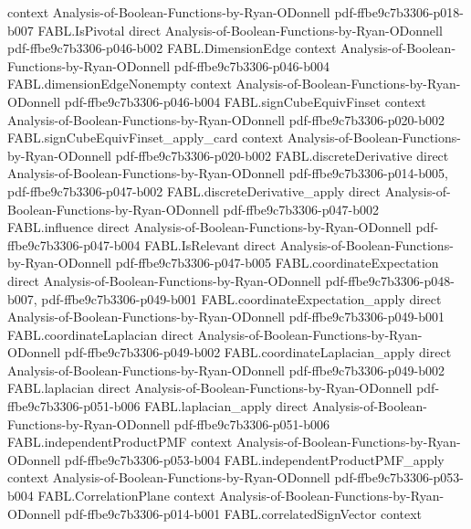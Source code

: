 \begin{theorem}
  {context}
  {Analysis-of-Boolean-Functions-by-Ryan-ODonnell}
  {pdf-ffbe9c7b3306-p018-b007}
\proofstep
  {FABL.IsPivotal}
  {direct}
  {Analysis-of-Boolean-Functions-by-Ryan-ODonnell}
  {pdf-ffbe9c7b3306-p046-b002}
\proofstep
  {FABL.DimensionEdge}
  {context}
  {Analysis-of-Boolean-Functions-by-Ryan-ODonnell}
  {pdf-ffbe9c7b3306-p046-b004}
\proofstep
  {FABL.dimensionEdgeNonempty}
  {context}
  {Analysis-of-Boolean-Functions-by-Ryan-ODonnell}
  {pdf-ffbe9c7b3306-p046-b004}
\proofstep
  {FABL.signCubeEquivFinset}
  {context}
  {Analysis-of-Boolean-Functions-by-Ryan-ODonnell}
  {pdf-ffbe9c7b3306-p020-b002}
\proofstep
  {FABL.signCubeEquivFinset_apply_card}
  {context}
  {Analysis-of-Boolean-Functions-by-Ryan-ODonnell}
  {pdf-ffbe9c7b3306-p020-b002}
\proofstep
  {FABL.discreteDerivative}
  {direct}
  {Analysis-of-Boolean-Functions-by-Ryan-ODonnell}
  {pdf-ffbe9c7b3306-p014-b005,
    pdf-ffbe9c7b3306-p047-b002}
\proofstep
  {FABL.discreteDerivative_apply}
  {direct}
  {Analysis-of-Boolean-Functions-by-Ryan-ODonnell}
  {pdf-ffbe9c7b3306-p047-b002}
\proofstep
  {FABL.influence}
  {direct}
  {Analysis-of-Boolean-Functions-by-Ryan-ODonnell}
  {pdf-ffbe9c7b3306-p047-b004}
\proofstep
  {FABL.IsRelevant}
  {direct}
  {Analysis-of-Boolean-Functions-by-Ryan-ODonnell}
  {pdf-ffbe9c7b3306-p047-b005}
\proofstep
  {FABL.coordinateExpectation}
  {direct}
  {Analysis-of-Boolean-Functions-by-Ryan-ODonnell}
  {pdf-ffbe9c7b3306-p048-b007,
    pdf-ffbe9c7b3306-p049-b001}
\proofstep
  {FABL.coordinateExpectation_apply}
  {direct}
  {Analysis-of-Boolean-Functions-by-Ryan-ODonnell}
  {pdf-ffbe9c7b3306-p049-b001}
\proofstep
  {FABL.coordinateLaplacian}
  {direct}
  {Analysis-of-Boolean-Functions-by-Ryan-ODonnell}
  {pdf-ffbe9c7b3306-p049-b002}
\proofstep
  {FABL.coordinateLaplacian_apply}
  {direct}
  {Analysis-of-Boolean-Functions-by-Ryan-ODonnell}
  {pdf-ffbe9c7b3306-p049-b002}
\proofstep
  {FABL.laplacian}
  {direct}
  {Analysis-of-Boolean-Functions-by-Ryan-ODonnell}
  {pdf-ffbe9c7b3306-p051-b006}
\proofstep
  {FABL.laplacian_apply}
  {direct}
  {Analysis-of-Boolean-Functions-by-Ryan-ODonnell}
  {pdf-ffbe9c7b3306-p051-b006}
\proofstep
  {FABL.independentProductPMF}
  {context}
  {Analysis-of-Boolean-Functions-by-Ryan-ODonnell}
  {pdf-ffbe9c7b3306-p053-b004}
\proofstep
  {FABL.independentProductPMF_apply}
  {context}
  {Analysis-of-Boolean-Functions-by-Ryan-ODonnell}
  {pdf-ffbe9c7b3306-p053-b004}
\proofstep
  {FABL.CorrelationPlane}
  {context}
  {Analysis-of-Boolean-Functions-by-Ryan-ODonnell}
  {pdf-ffbe9c7b3306-p014-b001}
\proofstep
  {FABL.correlatedSignVector}
  {context}

\end{theorem}

